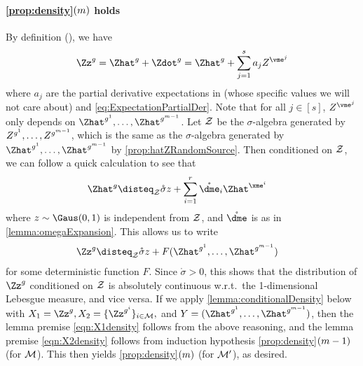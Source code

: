 \documentclass[main.tex]{subfiles}
\begin{document}
\paragraph{\ref{prop:density}$(m)$ holds}
By definition (), we have
\begin{align*}
\Zz^g = \Zhat^g + \Zdot^g = \Zhat^g + \sum_{j=1}^s a_j  Z^{\vme^j}
\end{align*}
where $a_j$ are the partial derivative expectations in  (whose specific values we will not care about) and \cref{eq:ExpectationPartialDer}.
Note that for all $j \in [s]$, $ Z^{\vme^j}$ only depends on $\Zhat^{g^1}, \ldots, \Zhat^{g^{\MM-1}}$.
Let $\mathcal{Z}$ be the $\sigma$-algebra generated by $Z^{g^1}, \ldots, Z^{g^{m-1}}$, which is the same as the $\sigma$-algebra generated by $\Zhat^{g^1}, \ldots, \Zhat^{g^{\MM-1}}$ by \cref{prop:hatZRandomSource}.
Then conditioned on $\mathcal{Z}$, we can follow a quick calculation to see that
\begin{align*}
\Zhat^{g}
  &\disteq_\prvZ
    \mathring \sigma z + \sum_{i=1}^r \mathring{\dme}_i \Zhat^{\xme^i}
\end{align*}
where $z \sim \Gaus(0, 1)$ is independent from $\mathcal{Z}$, and $\mathring{\dme}$ is as in \cref{lemma:omegaExpansion}.
This allows us to write
\begin{align*}
\Zz^g
  &\disteq_\prvZ
    \mathring \sigma z + F(\Zhat^{g^1}, \ldots, \Zhat^{g^{\MM-1}})
\end{align*}
for some deterministic function $F$.
Since $\mathring \sigma > 0$, this shows that the distribution of $\Zz^g$ conditioned on $\mathcal{Z}$ is absolutely continuous w.r.t.\ the 1-dimensional Lebesgue measure, and vice versa.
If we apply \cref{lemma:conditionalDensity} below with $X_1 = \Zz^g, X_2 = \{\Zz^{g^i}\}_{i \in \coreset},$ and $Y = (\Zhat^{g^1}, \ldots, \Zhat^{g^{\MM-1}})$, then the lemma premise \cref{eqn:X1density} follows from the above reasoning, and the lemma premise \cref{eqn:X2density} follows from induction hypothesis \ref{prop:density}$(m-1)$ (for $\mathcal{M}$).
This then yields \ref{prop:density}$(m)$ (for $\mathcal{M}'$), as desired.
\end{document}
